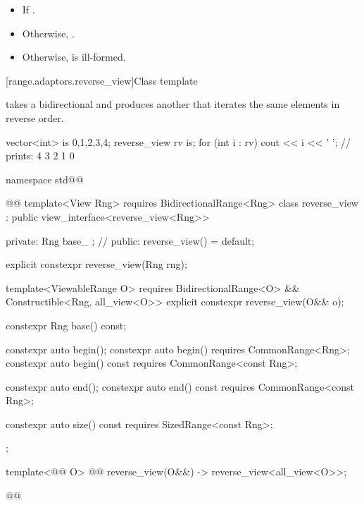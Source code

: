 \begin{itemize}
\item If   
.

\item Otherwise, 
.

\item Otherwise,  is ill-formed.
\end{itemize}


[range.adaptors.reverse_view]{Class template }

\pnum
{}  takes a bidirectional 
 and produces another   that
iterates the same elements in reverse order.

\pnum
\begin{example}
\begin{codeblock}
vector<int> is {0,1,2,3,4};
reverse_view rv {is};
for (int i : rv)
  cout << i << ' '; // prints: 4 3 2 1 0
\end{codeblock}
\end{example}

\begin{codeblock}
namespace std@@ { @@
  template<View Rng>
    requires BidirectionalRange<Rng>
  class reverse_view : public view_interface<reverse_view<Rng>> {
  private:
    Rng base_ {}; // \expos
  public:
    reverse_view() = default;

    explicit constexpr reverse_view(Rng rng);

    template<ViewableRange O>
      requires BidirectionalRange<O> && Constructible<Rng, all_view<O>>
    explicit constexpr reverse_view(O&& o);

    constexpr Rng base() const;

    constexpr auto begin();
    constexpr auto begin() requires CommonRange<Rng>;
    constexpr auto begin() const requires CommonRange<const Rng>;

    constexpr auto end();
    constexpr auto end() const requires CommonRange<const Rng>;

    constexpr auto size() const requires SizedRange<const Rng>;
  };

  template<@@ O>
    @@
  reverse_view(O&&) -> reverse_view<all_view<O>>;
}@\oldtxt{\}}@
\end{codeblock}

